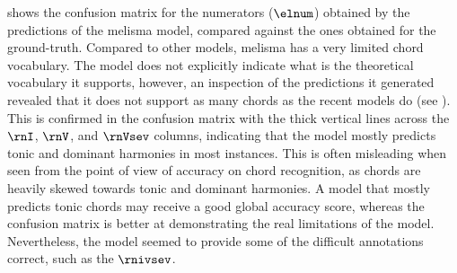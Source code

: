

 shows the confusion matrix
for the numerators ($\elnum$) obtained by the predictions of
the \gls{melisma} model, compared against the ones obtained
for the ground-truth. Compared to other models,
\gls{melisma} has a very limited chord vocabulary. The model
does not explicitly indicate what is the theoretical
vocabulary it supports, however, an inspection of the
predictions it generated revealed that it does not support
as many chords as the recent models do (see
). This is confirmed in the
confusion matrix with the thick vertical lines across the
$\rnI$, $\rnV$, and $\rnVsev$ columns, indicating that the
model mostly predicts tonic and dominant harmonies in most
instances. This is often misleading when seen from the point
of view of accuracy on chord recognition, as chords are
heavily skewed towards tonic and dominant harmonies. A model
that mostly predicts tonic chords may receive a good global
accuracy score, whereas the confusion matrix is better at
demonstrating the real limitations of the model.
Nevertheless, the model seemed to provide some of the
difficult annotations correct, such as the $\rnivsev$.



